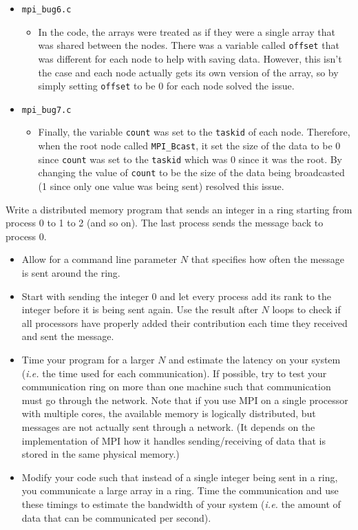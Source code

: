 \documentclass[addpoints]{exam}
\begin{document}
\begin{questions}
\begin{solution}
\begin{itemize}
\begin{itemize}
     \end{itemize}
\item {\tt mpi\_bug6.c}
     \begin{itemize}
       \item In the code, the arrays were treated as if they were a single array that was shared between the nodes. There was a variable called {\tt offset} that was different for each node to help with saving data. However, this isn't the case and each node actually gets its own version of the array, so by simply setting {\tt offset} to be 0 for each node solved the issue.
     \end{itemize}
\item {\tt mpi\_bug7.c}
     \begin{itemize}
       \item Finally, the variable {\tt count} was set to the {\tt taskid} of each node. Therefore, when the root node called {\tt MPI\_Bcast}, it set the size of the data to be 0 since {\tt count} was set to the {\tt taskid} which was 0 since it was the root. By changing the value of {\tt count} to be the size of the data being broadcasted (1 since only one value was being sent) resolved this issue.
     \end{itemize}
\end{itemize}
\end{solution}


Write a distributed memory program that sends an integer in a ring starting from process 0 to 1 to 2 (and so on). The last process sends the message back to process 0.

\begin{itemize}
\item Allow for a command line parameter $N$ that specifies how often the message is sent around the ring.
\item Start with sending the integer 0 and let every process add its rank to the integer before it is being sent again. Use the result after $N$ loops to check if all processors have properly added their contribution each time they received and sent the message.
\item Time your program for a larger $N$ and estimate the latency on your system ({\em i.e.} the time used for each communication). If possible, try to test your communication ring on more than one machine such that communication must go through the network. Note that if you use MPI on a single processor with multiple cores, the available memory is logically distributed, but messages are not actually sent through a network. (It depends on the implementation of MPI how it handles sending/receiving of data that is stored in the same physical memory.)
\item Modify your code such that instead of a single integer being sent in a ring, you communicate a large array in a ring. Time the communication and use these timings to estimate the bandwidth of your system ({\em i.e.} the amount of data that can be communicated per second).
\end{itemize}


\end{questions}
\end{document}
